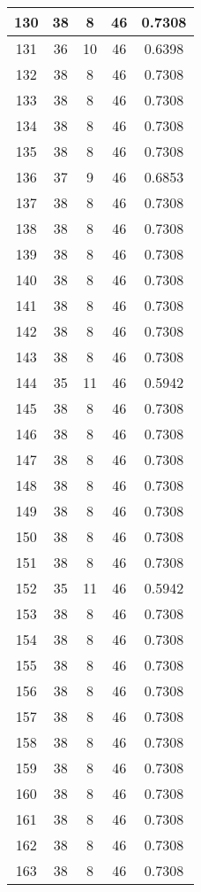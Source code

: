 \documentclass[letterpaper, 12pt]{article}
\begin{document}
\begin{longtable}{|c|c|c|c|c|}
\hline
130 & 38 & 8 & 46 & 0.7308 \\
\hline
131 & 36 & 10 & 46 & 0.6398 \\
\hline
132 & 38 & 8 & 46 & 0.7308 \\
\hline
133 & 38 & 8 & 46 & 0.7308 \\
\hline
134 & 38 & 8 & 46 & 0.7308 \\
\hline
135 & 38 & 8 & 46 & 0.7308 \\
\hline
136 & 37 & 9 & 46 & 0.6853 \\
\hline
137 & 38 & 8 & 46 & 0.7308 \\
\hline
138 & 38 & 8 & 46 & 0.7308 \\
\hline
139 & 38 & 8 & 46 & 0.7308 \\
\hline
140 & 38 & 8 & 46 & 0.7308 \\
\hline
141 & 38 & 8 & 46 & 0.7308 \\
\hline
142 & 38 & 8 & 46 & 0.7308 \\
\hline
143 & 38 & 8 & 46 & 0.7308 \\
\hline
144 & 35 & 11 & 46 & 0.5942 \\
\hline
145 & 38 & 8 & 46 & 0.7308 \\
\hline
146 & 38 & 8 & 46 & 0.7308 \\
\hline
147 & 38 & 8 & 46 & 0.7308 \\
\hline
148 & 38 & 8 & 46 & 0.7308 \\
\hline
149 & 38 & 8 & 46 & 0.7308 \\
\hline
150 & 38 & 8 & 46 & 0.7308 \\
\hline
151 & 38 & 8 & 46 & 0.7308 \\
\hline
152 & 35 & 11 & 46 & 0.5942 \\
\hline
153 & 38 & 8 & 46 & 0.7308 \\
\hline
154 & 38 & 8 & 46 & 0.7308 \\
\hline
155 & 38 & 8 & 46 & 0.7308 \\
\hline
156 & 38 & 8 & 46 & 0.7308 \\
\hline
157 & 38 & 8 & 46 & 0.7308 \\
\hline
158 & 38 & 8 & 46 & 0.7308 \\
\hline
159 & 38 & 8 & 46 & 0.7308 \\
\hline
160 & 38 & 8 & 46 & 0.7308 \\
\hline
161 & 38 & 8 & 46 & 0.7308 \\
\hline
162 & 38 & 8 & 46 & 0.7308 \\
\hline
163 & 38 & 8 & 46 & 0.7308 \\

\end{longtable}
\end{document}
